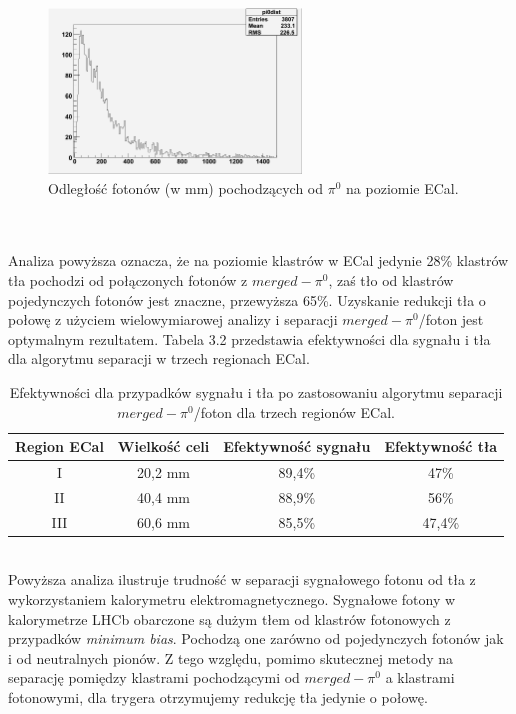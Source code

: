 \documentclass{pracamgr}
\begin{document}
\begin{figure}[!h]
 \centering
 \includegraphics[width=0.6\textwidth]{rysunki/pi0dist.png}
 \caption{Odległość fotonów (w mm) pochodzących od $\pi^0$ na poziomie ECal.}
\end{figure}
\\\\
\noindent 
Analiza powyższa oznacza, że na poziomie klastrów w ECal jedynie 28\% klastrów tła pochodzi od połączonych fotonów z $merged-\pi^0$, zaś tło od klastrów pojedynczych fotonów jest znaczne, przewyższa 65\%. Uzyskanie redukcji tła o połowę z użyciem wielowymiarowej analizy i separacji $merged-\pi^0$/foton jest optymalnym rezultatem. Tabela 3.2 przedstawia efektywności dla sygnału i tła dla algorytmu separacji w trzech regionach ECal.
\begin{table}[!h]
\centering
 \begin{tabular}{|c|c|c|c|}
  \hline
  Region ECal & Wielkość celi & Efektywność sygnału & Efektywność tła \\
  \hline
  I  & 20,2 mm & 89,4\% & 47\% \\
  \hline
  II & 40,4 mm & 88,9\% & 56\% \\
  \hline
  III & 60,6 mm & 85,5\% & 47,4\% \\
  \hline
 \end{tabular}
 \caption{Efektywności dla przypadków sygnału i tła po zastosowaniu algorytmu separacji $merged-\pi^0$/foton dla trzech regionów ECal.}
\end{table}
\\
\noindent
Powyższa analiza ilustruje trudność w separacji sygnałowego fotonu od tła z wykorzystaniem kalorymetru elektromagnetycznego. Sygnałowe fotony w kalorymetrze LHCb obarczone są dużym tłem od klastrów fotonowych z przypadków \textit{minimum bias}. Pochodzą one zarówno od pojedynczych fotonów jak i od neutralnych pionów. Z tego względu, pomimo skutecznej metody na separację pomiędzy klastrami pochodzącymi od $merged-\pi^0$ a klastrami fotonowymi, dla trygera otrzymujemy redukcję tła jedynie o połowę. 
\end{document}
